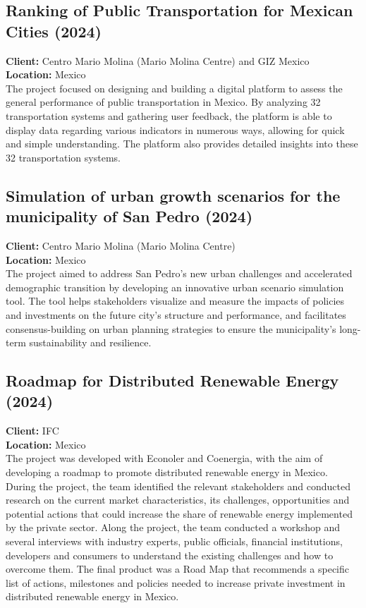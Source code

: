 \documentclass[
	a4paper,
	12pt,
	unnumberedsections,
]{CSSullivanBusinessReport}
\begin{document}
\subsection{Ranking of Public Transportation for Mexican Cities (2024)}
\textbf{Client:}  Centro Mario Molina (Mario Molina Centre) and GIZ Mexico \\
\textbf{Location:}  Mexico \\[0.5em]
 The project focused on designing and building a digital platform to assess the general performance of public transportation in Mexico. By analyzing 32 transportation systems and gathering user feedback, the platform is able to display data regarding various indicators in numerous ways, allowing for quick and simple understanding. The platform also provides detailed insights into these 32 transportation systems.

\subsection{Simulation of urban growth scenarios for the municipality of San Pedro (2024)}
\textbf{Client:}  Centro Mario Molina (Mario Molina Centre) \\
\textbf{Location:}  Mexico \\[0.5em]
 The project aimed to address San Pedro's new urban challenges and accelerated demographic transition by developing an innovative urban scenario simulation tool. The tool helps stakeholders visualize and measure the impacts of policies and investments on the future city’s structure and performance, and facilitates consensus-building on urban planning strategies to ensure the municipality's long-term sustainability and resilience.

\subsection{Roadmap for Distributed Renewable Energy (2024)}
\textbf{Client:}  IFC \\
\textbf{Location:}  Mexico \\[0.5em]
 The project was developed with Econoler and Coenergia, with the aim of developing a roadmap to promote distributed renewable energy in Mexico. During the project, the team identified the relevant stakeholders and conducted research on the current market characteristics, its challenges, opportunities and potential actions that could increase the share of renewable energy implemented by the private sector. Along the project, the team conducted a workshop and several interviews with industry experts, public officials, financial institutions, developers and consumers to understand the existing challenges and how to overcome them. The final product was a Road Map that recommends a specific list of actions, milestones and policies needed to increase private investment in distributed renewable energy in Mexico.
\end{document}
